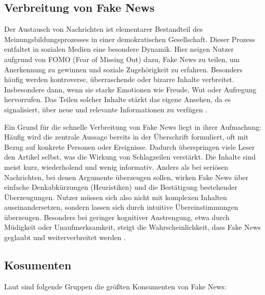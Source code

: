 \subsection{Verbreitung von Fake News}

Der Austausch von Nachrichten ist elementarer Bestandteil des Meinungsbildungsprozesses in einer demokratischen Gesellschaft. 
Dieser Prozess entfaltet in sozialen Medien eine besondere Dynamik. 
Hier neigen Nutzer aufgrund von FOMO (Fear of Missing Out) dazu, Fake News zu teilen, um Anerkennung zu gewinnen und soziale Zugehörigkeit zu erfahren. 
Besonders häufig werden kontroverse, überraschende oder bizarre Inhalte verbreitet. Insbesondere dann, wenn sie starke Emotionen wie Freude, Wut oder Aufregung hervorrufen. 
Das Teilen solcher Inhalte stärkt das eigene Ansehen, da es signalisiert, über neue und relevante Informationen zu verfügen \cite{socsci9100185}.

Ein Grund für die schnelle Verbreitung von Fake News liegt in ihrer Aufmachung: Häufig wird die zentrale Aussage bereits in der Überschrift formuliert, 
oft mit Bezug auf konkrete Personen oder Ereignisse. Dadurch überspringen viele Leser den Artikel selbst, was die Wirkung von Schlagzeilen verstärkt. 
Die Inhalte sind meist kurz, wiederholend und wenig informativ. Anders als bei seriösen Nachrichten, bei denen Argumente überzeugen sollen, wirken Fake News über einfache Denkabkürzungen 
(Heuristiken) und die Bestätigung bestehender Überzeugungen. 
Nutzer müssen sich also nicht mit komplexen Inhalten auseinandersetzen, sondern lassen sich durch intuitive Übereinstimmungen überzeugen. 
Besonders bei geringer kognitiver Anstrengung, etwa durch Müdigkeit oder Unaufmerksamkeit, steigt die Wahrscheinlichkeit, dass Fake News geglaubt und weiterverbreitet werden \cite{horne2017}.

\subsection{Kosumenten}

Laut \cite{horne2017} sind folgende Gruppen die größten Konsumenten von Fake News:

